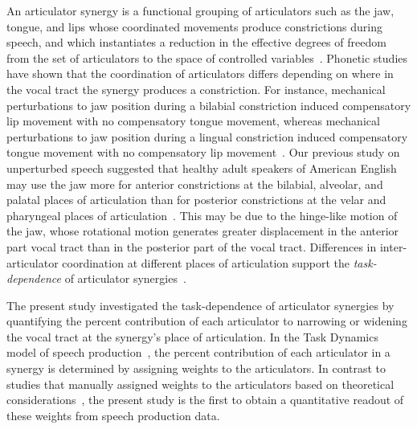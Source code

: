 \documentclass[reprint]{JASAnew}\usepackage[]{graphicx}\usepackage[]{color}
\begin{document}
An articulator synergy is a functional grouping of articulators such as the jaw, tongue, and lips whose coordinated movements produce constrictions during speech, and which instantiates a reduction in the effective degrees of freedom from the set of articulators to the space of controlled variables~\cite{turvey1977preliminaries}.
%
Phonetic studies have shown that the coordination of articulators differs depending on where in the vocal tract the synergy produces a constriction. 
%
For instance, mechanical perturbations to jaw position during a bilabial constriction induced compensatory lip movement with no compensatory tongue movement, 
%
whereas mechanical perturbations to jaw position during a lingual constriction induced compensatory tongue movement with no compensatory lip movement~\citep{kelso1984functionally}. 
%
Our previous study on unperturbed speech suggested that healthy adult speakers of American English may use the jaw more for anterior constrictions at the bilabial, alveolar, and palatal places of articulation than for posterior constrictions at the velar and pharyngeal places of articulation~\citep{Sorensen+2016}. 
%
This may be due to the hinge-like motion of the jaw, whose rotational motion generates greater displacement in the anterior part vocal tract than in the posterior part of the vocal tract.
%
Differences in inter-articulator coordination at different places of articulation support the \textit{task-dependence} of articulator synergies~\citep{latash2008synergy}. 

The present study investigated the task-dependence of articulator synergies by quantifying the percent contribution of each articulator to narrowing or widening the vocal tract at the synergy's place of articulation. 
%
In the Task Dynamics model of speech production~\citep{saltzman1989dynamical}, the percent contribution of each articulator in a synergy is determined by assigning weights to the articulators. 
%
In contrast to studies that manually assigned weights to the articulators based on theoretical considerations~\citep[for example, see][for an assignment of weights based on articulator mass]{simko2010embodied}, the present study is the first to obtain a quantitative readout of these weights from speech production data. 
\end{document}
